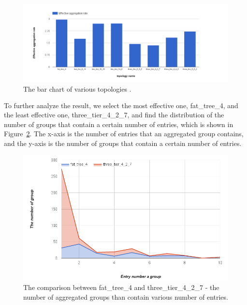 \begin{figure}[H]
\begin{center} 
\includegraphics[width=1.4\linewidth]{figures/exp_topotype_bar.png}
\end{center}
\caption{The bar chart of various topologies .}
\label{different_topo_bar}
\end{figure}

To further analyze the result, we select the most effective one, fat\_tree\_4, and the least effective one, three\_tier\_4\_2\_7, and find the distribution of the number of groups that contain a certain number of entries, which is shown in Figure~\ref{different_topo_distribute}. The x-axis is the number of entries that an aggregated group contains, and the y-axis is the number of groups that contain a certain number of entries.

\begin{figure}[H]
\begin{center} 
\includegraphics[width=1.1\linewidth]{figures/exp_topotype_distribute.png}
\end{center}
\caption{The comparison between fat\_tree\_4 and three\_tier\_4\_2\_7 - the number of aggregated groups than contain various number of entries. }
\label{different_topo_distribute}
\end{figure}

